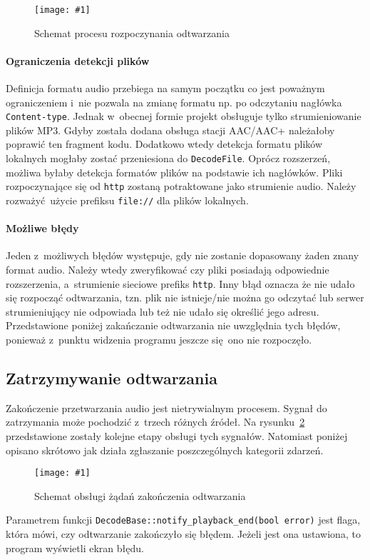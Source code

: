 \documentclass[polish]{aghengthesis}
\newcommand{\imgint}[4]{
	\begin{figure}[{#4}]
		\centering
		\texttt{[image: \#1]}
		\caption{#2}
		\label{#1}
	\end{figure}
}
\newcommand{\imgh}[3]{\imgint{#1}{#2}{#3}{H}}
\begin{document}
			\imgh{3/PicoRadio-start}{Schemat procesu rozpoczynania odtwarzania}{0.7}
				
			\paragraph{Ograniczenia detekcji plików}
				Definicja formatu audio przebiega na samym początku co jest poważnym ograniczeniem i~nie pozwala na zmianę formatu np. po odczytaniu nagłówka \lstinline|Content-type|. Jednak w~obecnej formie projekt obsługuje tylko strumieniowanie plików MP3. Gdyby została dodana obsługa stacji AAC/AAC+ należałoby poprawić ten fragment kodu. Dodatkowo wtedy detekcja formatu plików lokalnych mogłaby zostać przeniesiona do \lstinline|DecodeFile|. Oprócz rozszerzeń, możliwa byłaby detekcja formatów plików na podstawie ich nagłówków. Pliki rozpoczynające się od \lstinline|http| zostaną potraktowane jako strumienie audio. Należy rozważyć użycie prefiksu \lstinline|file://| dla plików lokalnych.
			
			\paragraph{Możliwe błędy}
				Jeden z~możliwych błędów występuje, gdy nie zostanie dopasowany żaden znany format audio. Należy wtedy zweryfikować czy pliki posiadają odpowiednie rozszerzenia, a~strumienie sieciowe prefiks \lstinline|http|. Inny błąd oznacza że nie udało się rozpocząć odtwarzania, tzn. plik nie istnieje/nie można go odczytać lub serwer strumieniujący nie odpowiada lub też nie udało się określić jego adresu. Przedstawione poniżej zakańczanie odtwarzania nie uwzględnia tych błędów, ponieważ z~punktu widzenia programu jeszcze się ono nie rozpoczęło.
		
		\subsection{Zatrzymywanie odtwarzania}
			Zakończenie przetwarzania audio jest nietrywialnym procesem. Sygnał do zatrzymania może pochodzić z~trzech różnych źródeł. Na rysunku~\ref{3/PicoRadio-stop} przedstawione zostały kolejne etapy obsługi tych sygnałów. Natomiast poniżej opisano skrótowo jak działa zgłaszanie poszczególnych kategorii zdarzeń. 
			
			\imgh{3/PicoRadio-stop}{Schemat obsługi żądań zakończenia odtwarzania}{1}
			
			Parametrem funkcji \lstinline|DecodeBase::notify_playback_end(bool error)| jest flaga, która mówi, czy odtwarzanie zakończyło się błędem. Jeżeli jest ona ustawiona, to program wyświetli ekran błędu.
			
\end{document}
